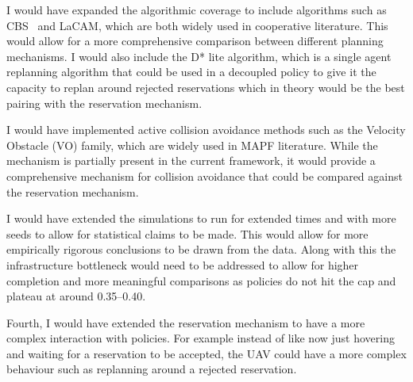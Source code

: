 \vspace{1em}

I would have expanded the algorithmic coverage to include algorithms such as CBS~\cite{sharon2015cbs} and LaCAM, which are both widely used in cooperative literature. This would allow for a more comprehensive comparison between different planning mechanisms. I would also include the D* lite algorithm, which is a single agent replanning algorithm that could be used in a decoupled policy to give it the capacity to replan around rejected reservations which in theory would be the best pairing with the reservation mechanism.\par

\vspace{1em}

I would have implemented active collision avoidance methods such as the Velocity Obstacle (VO) family, which are widely used in MAPF literature. While the mechanism is partially present in the current framework, it would provide a comprehensive mechanism for collision avoidance that could be compared against the reservation mechanism.\par

\vspace{1em}

I would have extended the simulations to run for extended times and with more seeds to allow for statistical claims to be made. This would allow for more empirically rigorous conclusions to be drawn from the data. Along with this the infrastructure bottleneck would need to be addressed to allow for higher completion and more meaningful comparisons as policies do not hit the cap and plateau at around 0.35--0.40.\par

\vspace{1em}

Fourth, I would have extended the reservation mechanism to have a more complex interaction with policies. For example instead of like now just hovering and waiting for a reservation to be accepted, the UAV could have a more complex behaviour such as replanning around a rejected reservation. \par

\vspace{1em}